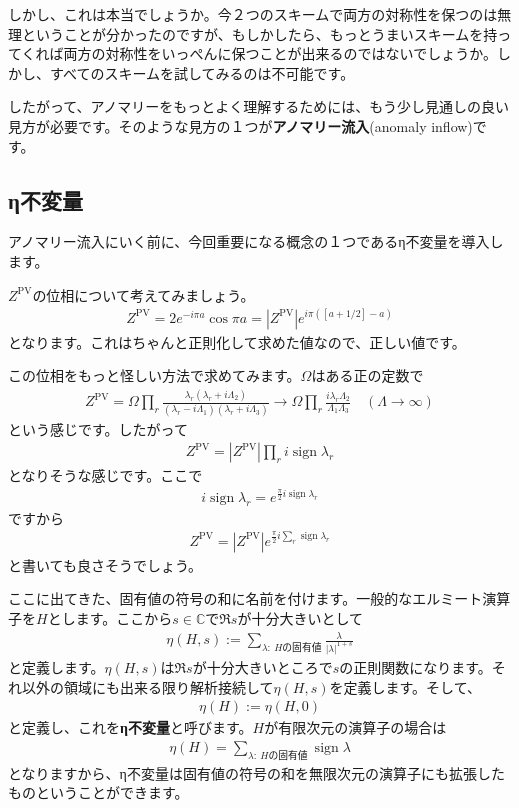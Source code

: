 \documentclass[paper=a4, fontsize=12pt, line_length=16cm, number_of_lines=33,dvipdfmx]{jlreq}
\numberwithin{equation}{section}
\newcommand{\Cb}{\mathbb{C}}
\newcommand{\strong}[1]{\textsf{\bfseries #1}}
\newcommand{\ZPV}{Z^{\mathrm{PV}}}
\DeclareMathOperator{\sign}{\mathrm{sign}}
\begin{document}
しかし、これは本当でしょうか。今２つのスキームで両方の対称性を保つのは無理ということが分かったのですが、もしかしたら、もっとうまいスキームを持ってくれば両方の対称性をいっぺんに保つことが出来るのではないでしょうか。しかし、すべてのスキームを試してみるのは不可能です。

したがって、アノマリーをもっとよく理解するためには、もう少し見通しの良い見方が必要です。そのような見方の１つが\strong{アノマリー流入}(anomaly inflow)です。

\subsection{η不変量}
アノマリー流入にいく前に、今回重要になる概念の１つであるη不変量を導入します。

$\ZPV$の位相について考えてみましょう。
\begin{align}
  \ZPV=2e^{-i\pi a} \cos \pi a=|\ZPV|e^{i\pi ([a+1/2]-a)}\label{phasePVexplicit}
\end{align}
となります。これはちゃんと正則化して求めた値なので、正しい値です。

この位相をもっと怪しい方法で求めてみます。$\Omega$はある正の定数で
\begin{align}
  \ZPV=\Omega \prod_{r}\frac{\lambda_r(\lambda_r+i\Lambda_2)}{(\lambda_r-i\Lambda_1)(\lambda_r+i\Lambda_3)}
  \to \Omega\prod_{r}\frac{i\lambda_r\Lambda_2}{\Lambda_1\Lambda_3}\quad (\Lambda\to \infty)
\end{align}
という感じです。したがって
\begin{align}
  \ZPV=|\ZPV|\prod_{r}i\sign \lambda_r
\end{align}
となりそうな感じです。ここで
\begin{align}
  i\sign \lambda_r=e^{\frac{\pi}{2}i\sign \lambda_r}
\end{align}
ですから
\begin{align}
  \ZPV=|\ZPV|e^{\frac{\pi}{2}i\sum_{r}\sign \lambda_r}\label{phasePV0}
\end{align}
と書いても良さそうでしょう。

ここに出てきた、固有値の符号の和に名前を付けます。一般的なエルミート演算子を$H$とします。ここから$s\in \Cb$で$\Re s$が十分大きいとして
\begin{align}
  \eta(H,s):=\sum_{\lambda:\ H\text{の固有値}}\frac{\lambda}{|\lambda|^{1+s}}
\end{align}
と定義します。$\eta(H,s)$は$\Re s$が十分大きいところで$s$の正則関数になります。それ以外の領域にも出来る限り解析接続して$\eta(H,s)$を定義します。そして、
\begin{align}
  \eta(H):=\eta(H,0)
\end{align}
と定義し、これを\strong{η不変量}と呼びます。$H$が有限次元の演算子の場合は
\begin{align}
  \eta(H)=\sum_{\lambda:\ H\text{の固有値}}\sign \lambda
\end{align}
となりますから、η不変量は固有値の符号の和を無限次元の演算子にも拡張したものということができます。
\end{document}
